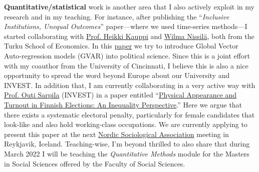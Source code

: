 \documentclass[10pt,stdletter,dateno,sigleft]{newlfm} %
\begin{document}
\begin{newlfm}
{\bf Quantitative/statistical} work is another area that I also actively exploit in my research and in my teaching. For instance, after publishing the ``\emph{Inclusive Institutions, Unequal Outcomes}'' paper---where we used time-series methods---I started collaborating with \href{https://www.utu.fi/en/people/heikki-kauppi}{Prof. Heikki Kauppi} and \href{https://www.utu.fi/en/people/wilma-nissila}{Wilma Nissil{\"a}}, both from the Turku School of Economics. In this \href{https://github.com/hbahamonde/Bahamonde_Kovac/raw/master/abstract.txt}{paper} we try to introduce Global Vector Auto-regression models (GVAR) into political science. Since this is a joint effort with my coauthor from the University of Cincinnati, I believe this is also a nice opportunity to spread the word beyond Europe about our University and INVEST. In addition that, I am currently collaborating in a very active way with \href{https://www.utu.fi/en/people/outi-sarpila}{Prof. Outi Sarpila} (INVEST) in a paper entitled ``\href{https://raw.githubusercontent.com/hbahamonde/Physical/main/abstract.rtf}{Physical Appearance and Turnout in Finnish Elections: An Inequality Perspective}.'' Here we argue that there exists a systematic electoral penalty, particularly for female candidates that look-like and also hold working-class occupations. We are currently applying to present this paper at the next \href{https://nsa2022.is}{Nordic Sociological Association} meeting in Reykjavik, Iceland. Teaching-wise, I'm beyond thrilled to also share that during March 2022 I will be teaching the \emph{Quantitative Methods} module for the Masters in Social Sciences offered by the Faculty of Social Sciences. 


\end{newlfm}
\end{document}
